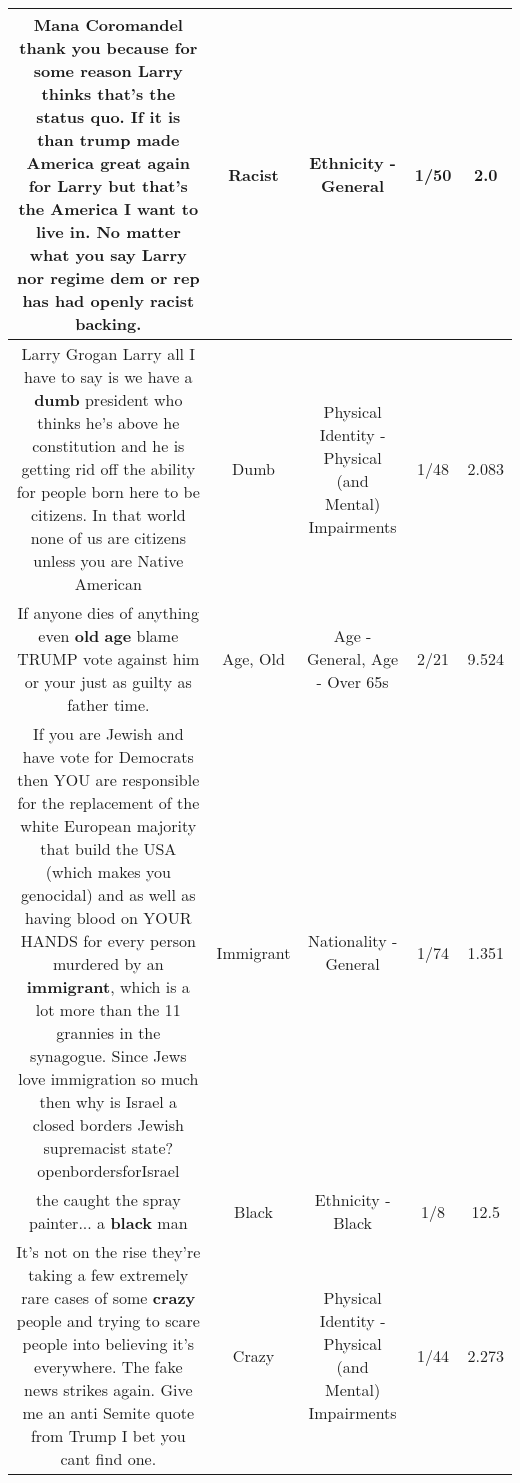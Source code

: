 \documentclass[11pt]{article}
\newlength\mylength
\begin{document}
\begin{center}
\begin{longtable}{|C{.65\mylength}|C{.30\mylength}|C{.12\mylength}|C{.12\mylength}|C{.12\mylength}|}
  \small Mana Coromandel thank you because for some reason Larry thinks that's the status quo. If it is than trump made America great again for Larry but that's the America I want to live in. No matter what you say Larry nor regime dem or rep has had openly \textbf{racist} backing.\normalsize   & Racist & Ethnicity - General & 1/50 & 2.0 \\  \hline
  \small Larry Grogan Larry all I have to say is we have a \textbf{dumb} president who thinks he's above he constitution and he is getting rid off the ability for people born here to be citizens. In that world none of us are citizens unless you are Native American\normalsize   & Dumb & Physical Identity - Physical (and Mental) Impairments & 1/48 & 2.083 \\  \hline
  \small If anyone dies of anything even \textbf{old} \textbf{age} blame TRUMP vote against him or your just as guilty as father time.\normalsize   & Age, Old & Age - General, Age - Over 65s & 2/21 & 9.524 \\  \hline
  \small If you are Jewish and have vote for Democrats then YOU are responsible for the replacement of the white European majority that build the USA (which makes you genocidal) and as well as having blood on YOUR HANDS for every person murdered by an \textbf{immigrant}, which is a lot more than the 11 grannies in the synagogue. Since Jews love immigration so much then why is Israel a closed borders Jewish supremacist state? openbordersforIsrael\normalsize   & Immigrant & Nationality - General & 1/74 & 1.351 \\  \hline
  \small the caught the spray painter... a \textbf{black} man\normalsize   & Black & Ethnicity - Black & 1/8 & 12.5 \\  \hline
  \small It's not on the rise they're taking a few extremely rare cases of some \textbf{crazy} people and trying to scare people into believing it's everywhere. The fake news strikes again. Give me an anti Semite quote from Trump I bet you cant find one.\normalsize   & Crazy & Physical Identity - Physical (and Mental) Impairments & 1/44 & 2.273 \\  \hline

\end{longtable}
\end{center}
\end{document}
